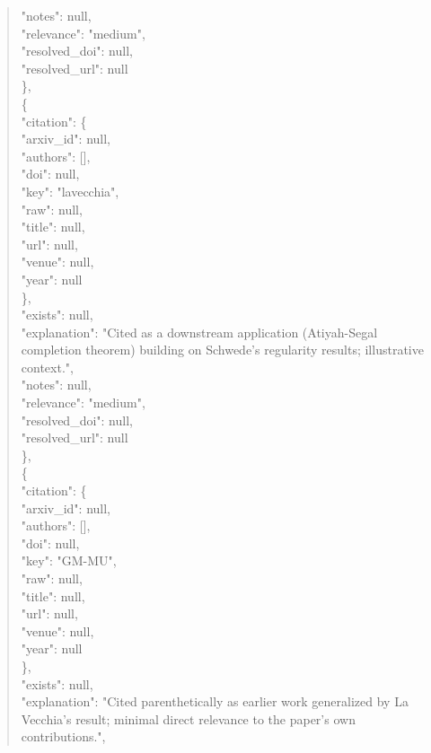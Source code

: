 \documentclass[11pt]{article}
\begin{document}
\begin{quote}
      "notes": null,\\
      "relevance": "medium",\\
      "resolved\_doi": null,\\
      "resolved\_url": null\\
    \},\\
    \{\\
      "citation": \{\\
        "arxiv\_id": null,\\
        "authors": [],\\
        "doi": null,\\
        "key": "lavecchia",\\
        "raw": null,\\
        "title": null,\\
        "url": null,\\
        "venue": null,\\
        "year": null\\
      \},\\
      "exists": null,\\
      "explanation": "Cited as a downstream application (Atiyah-Segal completion theorem) building on Schwede's regularity results; illustrative context.",\\
      "notes": null,\\
      "relevance": "medium",\\
      "resolved\_doi": null,\\
      "resolved\_url": null\\
    \},\\
    \{\\
      "citation": \{\\
        "arxiv\_id": null,\\
        "authors": [],\\
        "doi": null,\\
        "key": "GM-MU",\\
        "raw": null,\\
        "title": null,\\
        "url": null,\\
        "venue": null,\\
        "year": null\\
      \},\\
      "exists": null,\\
      "explanation": "Cited parenthetically as earlier work generalized by La Vecchia's result; minimal direct relevance to the paper's own contributions.",\\

\end{quote}
\end{document}
